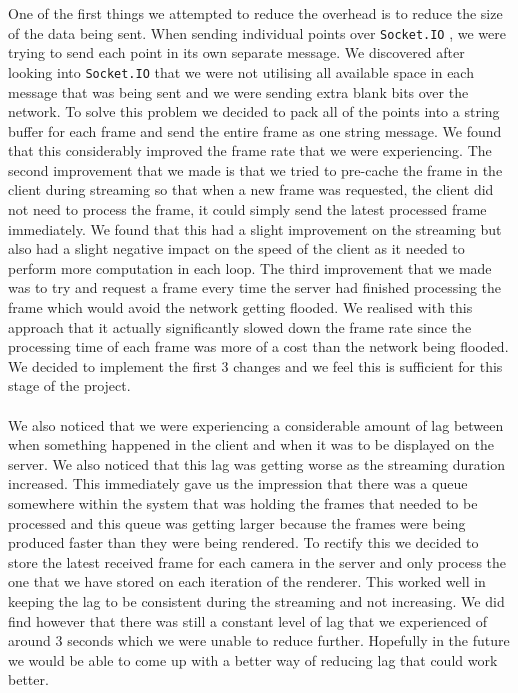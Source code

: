 \documentclass{article}
\begin{document}
One of the first things we attempted to reduce the overhead is to reduce the size of the data being sent. When sending individual points over \texttt{Socket.IO} \cite{socketio}, we were trying to send each point in its own separate message. We discovered after looking into \texttt{Socket.IO} \cite{socketio} that we were not utilising all available space in each message that was being sent and we were sending extra blank bits over the network. To solve this problem we decided to pack all of the points into a string buffer for each frame and send the entire frame as one string message. We found that this considerably improved the frame rate that we were experiencing. The second improvement that we made is that we tried to pre-cache the frame in the client during streaming so that when a new frame was requested, the client did not need to process the frame, it could simply send the latest processed frame immediately. We found that this had a slight improvement on the streaming but also had a slight negative impact on the speed of the client as it needed to perform more computation in each loop. The third improvement that we made was to try and request a frame every time the server had finished processing the frame which would avoid the network getting flooded. We realised with this approach that it actually significantly slowed down the frame rate since the processing time of each frame was more of a cost than the network being flooded. We decided to implement the first 3 changes and we feel this is sufficient for this stage of the project.
\\\\
We also noticed that we were experiencing a considerable amount of lag between when something happened in the client and when it was to be displayed on the server. We also noticed that this lag was getting worse as the streaming duration increased. This immediately gave us the impression that there was a queue somewhere within the system that was holding the frames that needed to be processed and this queue was getting larger because the frames were being produced faster than they were being rendered. To rectify this we decided to store the latest received frame for each camera in the server and only process the one that we have stored on each iteration of the renderer. This worked well in keeping the lag to be consistent during the streaming and not increasing. We did find however that there was still a constant level of lag that we experienced of around 3 seconds which we were unable to reduce further. Hopefully in the future we would be able to come up with a better way of reducing lag that could work better.
\end{document}
